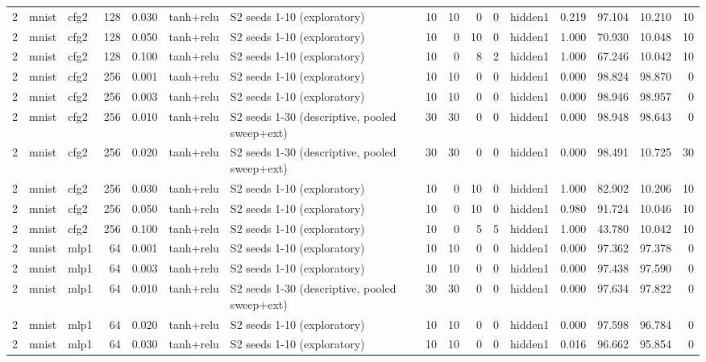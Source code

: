 \begin{table}[htbp]
{\begin{tabular}{@{}rllrrllrrrrlrrrr@{}}
2 & mnist & cfg2 & 128 & 0.030 & tanh+relu & S2 seeds 1-10 (exploratory) & 10 & 10 & 0 & 0 & hidden1 & 0.219 & 97.104 & 10.210 & 10 \\
2 & mnist & cfg2 & 128 & 0.050 & tanh+relu & S2 seeds 1-10 (exploratory) & 10 & 0 & 10 & 0 & hidden1 & 1.000 & 70.930 & 10.048 & 10 \\
2 & mnist & cfg2 & 128 & 0.100 & tanh+relu & S2 seeds 1-10 (exploratory) & 10 & 0 & 8 & 2 & hidden1 & 1.000 & 67.246 & 10.042 & 10 \\
2 & mnist & cfg2 & 256 & 0.001 & tanh+relu & S2 seeds 1-10 (exploratory) & 10 & 10 & 0 & 0 & hidden1 & 0.000 & 98.824 & 98.870 & 0 \\
2 & mnist & cfg2 & 256 & 0.003 & tanh+relu & S2 seeds 1-10 (exploratory) & 10 & 10 & 0 & 0 & hidden1 & 0.000 & 98.946 & 98.957 & 0 \\
2 & mnist & cfg2 & 256 & 0.010 & tanh+relu & S2 seeds 1-30 (descriptive, pooled sweep+ext) & 30 & 30 & 0 & 0 & hidden1 & 0.000 & 98.948 & 98.643 & 0 \\
2 & mnist & cfg2 & 256 & 0.020 & tanh+relu & S2 seeds 1-30 (descriptive, pooled sweep+ext) & 30 & 30 & 0 & 0 & hidden1 & 0.000 & 98.491 & 10.725 & 30 \\
2 & mnist & cfg2 & 256 & 0.030 & tanh+relu & S2 seeds 1-10 (exploratory) & 10 & 0 & 10 & 0 & hidden1 & 1.000 & 82.902 & 10.206 & 10 \\
2 & mnist & cfg2 & 256 & 0.050 & tanh+relu & S2 seeds 1-10 (exploratory) & 10 & 0 & 10 & 0 & hidden1 & 0.980 & 91.724 & 10.046 & 10 \\
2 & mnist & cfg2 & 256 & 0.100 & tanh+relu & S2 seeds 1-10 (exploratory) & 10 & 0 & 5 & 5 & hidden1 & 1.000 & 43.780 & 10.042 & 10 \\
2 & mnist & mlp1 & 64 & 0.001 & tanh+relu & S2 seeds 1-10 (exploratory) & 10 & 10 & 0 & 0 & hidden1 & 0.000 & 97.362 & 97.378 & 0 \\
2 & mnist & mlp1 & 64 & 0.003 & tanh+relu & S2 seeds 1-10 (exploratory) & 10 & 10 & 0 & 0 & hidden1 & 0.000 & 97.438 & 97.590 & 0 \\
2 & mnist & mlp1 & 64 & 0.010 & tanh+relu & S2 seeds 1-30 (descriptive, pooled sweep+ext) & 30 & 30 & 0 & 0 & hidden1 & 0.000 & 97.634 & 97.822 & 0 \\
2 & mnist & mlp1 & 64 & 0.020 & tanh+relu & S2 seeds 1-10 (exploratory) & 10 & 10 & 0 & 0 & hidden1 & 0.000 & 97.598 & 96.784 & 0 \\
2 & mnist & mlp1 & 64 & 0.030 & tanh+relu & S2 seeds 1-10 (exploratory) & 10 & 10 & 0 & 0 & hidden1 & 0.016 & 96.662 & 95.854 & 0 \\

\end{tabular}}
\end{table}
